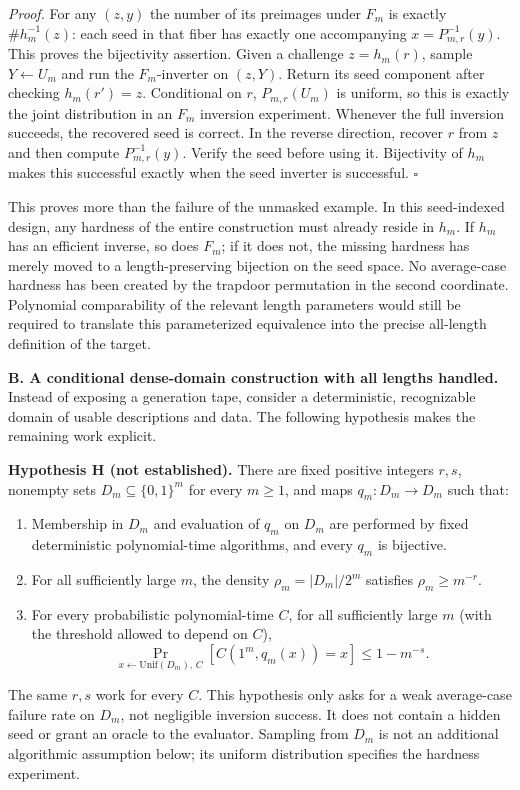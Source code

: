 \documentclass[11pt,a4paper]{article}
\numberwithin{equation}{section}
\begin{document}
\textit{Proof.}
For any $(z,y)$ the number of its preimages under $F_m$ is exactly
$\#h_m^{-1}(z)$: each seed in that fiber has exactly one accompanying
$x=P_{m,r}^{-1}(y)$. This proves the bijectivity assertion.
Given a challenge $z=h_m(r)$, sample $Y\leftarrow U_m$ and run the
$F_m$-inverter on $(z,Y)$. Return its seed component after checking
$h_m(r')=z$. Conditional on $r$, $P_{m,r}(U_m)$ is uniform, so this is
exactly the joint distribution in an $F_m$ inversion experiment.
Whenever the full inversion succeeds, the recovered seed is correct.
In the reverse direction, recover $r$ from $z$ and then compute
$P_{m,r}^{-1}(y)$. Verify the seed before using it. Bijectivity of $h_m$
makes this successful exactly when the seed inverter is successful.
\hfill$\square$

This proves more than the failure of the unmasked example. In this
seed-indexed design, any hardness of the entire construction must
already reside in $h_m$. If $h_m$ has an efficient inverse, so does
$F_m$; if it does not, the missing hardness has merely moved to a
length-preserving bijection on the seed space. No average-case hardness
has been created by the trapdoor permutation in the second coordinate.
Polynomial comparability of the relevant length parameters would still
be required to translate this parameterized equivalence into the precise
all-length definition of the target.

\medskip{}
\textbf{B. A conditional dense-domain construction with all lengths handled.}
Instead of exposing a generation tape, consider a deterministic,
recognizable domain of usable descriptions and data. The following
hypothesis makes the remaining work explicit.

\textbf{Hypothesis H (not established).}
There are fixed positive integers $r,s$, nonempty sets
$D_m\subseteq\{0,1\}^m$ for every $m\ge1$, and maps
$q_m:D_m\to D_m$ such that:
\begin{enumerate}[label=(\roman*),leftmargin=2.8em,itemsep=3pt]
\item Membership in $D_m$ and evaluation of $q_m$ on $D_m$ are performed
by fixed deterministic polynomial-time algorithms, and every $q_m$ is
bijective.
\item For all sufficiently large $m$, the density
$\rho_m=|D_m|/2^m$ satisfies $\rho_m\ge m^{-r}$.
\item For every probabilistic polynomial-time $C$, for all sufficiently
large $m$ (with the threshold allowed to depend on $C$),
\begin{equation}\label{eq:statement:H}
 \Pr_{x\leftarrow\mathrm{Unif}(D_m),\,C}
       [C(1^m,q_m(x))=x]\le 1-m^{-s}.
\end{equation}
\end{enumerate}
The same $r,s$ work for every $C$. This hypothesis only asks for a weak
average-case failure rate on $D_m$, not negligible inversion success.
It does not contain a hidden seed or grant an oracle to the evaluator.
Sampling from $D_m$ is not an additional algorithmic assumption below;
its uniform distribution specifies the hardness experiment.
\end{document}

